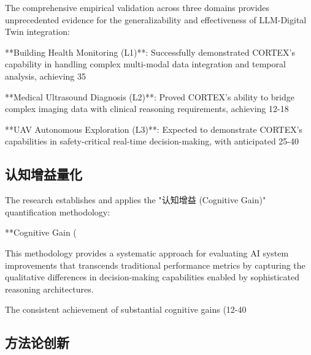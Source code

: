 The comprehensive empirical validation across three domains provides unprecedented evidence for the generalizability and effectiveness of LLM-Digital Twin integration:

**Building Health Monitoring (L1)**: Successfully demonstrated CORTEX's capability in handling complex multi-modal data integration and temporal analysis, achieving 35%

**Medical Ultrasound Diagnosis (L2)**: Proved CORTEX's ability to bridge complex imaging data with clinical reasoning requirements, achieving 12-18%

**UAV Autonomous Exploration (L3)**: Expected to demonstrate CORTEX's capabilities in safety-critical real-time decision-making, with anticipated 25-40%

\subsection{认知增益量化}

The research establishes and applies the "认知增益 (Cognitive Gain)" quantification methodology:

**Cognitive Gain (%

This methodology provides a systematic approach for evaluating AI system improvements that transcends traditional performance metrics by capturing the qualitative differences in decision-making capabilities enabled by sophisticated reasoning architectures.

The consistent achievement of substantial cognitive gains (12-40%

\subsection{方法论创新}

